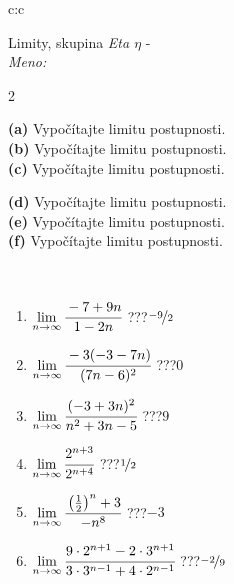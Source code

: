 \documentclass[10pt]{report}
\begin{document}
\newpage
\thispagestyle{empty}
\begin{tabular}{c:c}
\begin{minipage}[c][104.5mm][t]{0.5\linewidth}
\begin{center}
\vspace{5mm}
{\huge Limity, skupina \textit{Eta $\eta$} -}\\[5mm]
\textit{Meno:}\phantom{xxxxxxxxxxxxxxxxxxxxxxxxxxxxxxxxxxxxxxxxxxxxxxxxxxxxxxxxxxxxxxxxx}\\[5mm]
\begin{minipage}{0.95\linewidth}
\begin{center}
{\small \begin{multicols}{2} \raggedright
\textbf{(a)} Vypočítajte limitu postupnosti. \\[1mm]
\textbf{(b)} Vypočítajte limitu postupnosti. \\[1mm]
\textbf{(c)} Vypočítajte limitu postupnosti. \par \columnbreak
\textbf{(d)} Vypočítajte limitu postupnosti. \\[1mm]
\textbf{(e)} Vypočítajte limitu postupnosti. \\[1mm]
\textbf{(f)} Vypočítajte limitu postupnosti.
\end{multicols}
}
\end{center}
\end{minipage}
\\[1mm]
\begin{minipage}{0.79\linewidth}
\begin{center}
\begin{varwidth}{\linewidth}
\setlength{\itemsep}{0pt}
\begin{enumerate}
\footnotesizerr
\item $\lim\limits_{n\to\infty}\cfrac{-7+9n}{1-2n}$\quad \dotfill\; ???\;\dotfill \quad $\nicefrac{-9}{2}$
\item $\lim\limits_{n\to\infty}\cfrac{-3(-3-7n)}{(7n-6)^2}$\quad \dotfill\; ???\;\dotfill \quad $0$
\item $\lim\limits_{n\to\infty}\cfrac{(-3+3n)^2}{n^2+3n-5}$\quad \dotfill\; ???\;\dotfill \quad $9$
\item $\lim\limits_{n\to\infty}\cfrac{2^{n+3}}{2^{n+4}}$\quad \dotfill\; ???\;\dotfill \quad $\nicefrac{1}{2}$
\item $\lim\limits_{n\to\infty}\cfrac{\left(\frac{1}{2}\right)^n +3}{-n^{8}}$\quad \dotfill\; ???\;\dotfill \quad $-3$
\item $\lim\limits_{n\to\infty}\cfrac{9\cdot 2^{n+1}-2\cdot 3^{n+1}}{3\cdot 3^{n-1}+4\cdot 2^{n-1}}$\quad \dotfill\; ???\;\dotfill \quad $\nicefrac{-2}{9}$

\end{enumerate}
\end{varwidth}
\end{center}
\end{minipage}
\end{center}
\end{minipage}
\end{tabular}
\end{document}
